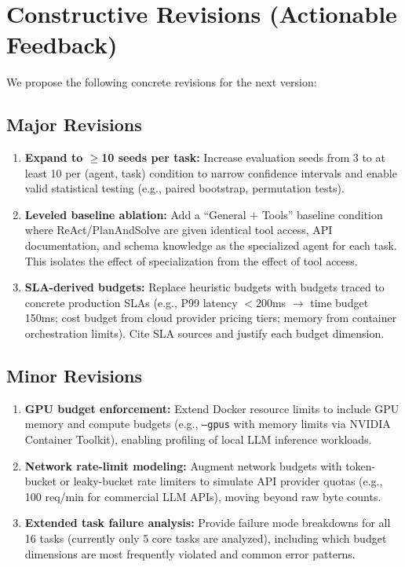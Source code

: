 \documentclass[letterpaper, 10 pt, conference]{ieeeconf}
\begin{document}
\section{Constructive Revisions (Actionable Feedback)}
\label{sec:revisions}

We propose the following concrete revisions for the next version:

\subsection*{Major Revisions}
\begin{enumerate}
    \item \textbf{Expand to $\ge$10 seeds per task:} Increase evaluation seeds from 3 to at least 10 per (agent, task) condition to narrow confidence intervals and enable valid statistical testing (e.g., paired bootstrap, permutation tests).
    
    \item \textbf{Leveled baseline ablation:} Add a ``General + Tools'' baseline condition where ReAct/PlanAndSolve are given identical tool access, API documentation, and schema knowledge as the specialized agent for each task. This isolates the effect of specialization from the effect of tool access.
    
    \item \textbf{SLA-derived budgets:} Replace heuristic budgets with budgets traced to concrete production SLAs (e.g., P99 latency $<200$ms $\to$ time budget 150ms; cost budget from cloud provider pricing tiers; memory from container orchestration limits). Cite SLA sources and justify each budget dimension.
\end{enumerate}

\subsection*{Minor Revisions}
\begin{enumerate}[resume]
    \item \textbf{GPU budget enforcement:} Extend Docker resource limits to include GPU memory and compute budgets (e.g., \texttt{--gpus} with memory limits via NVIDIA Container Toolkit), enabling profiling of local LLM inference workloads.
    
    \item \textbf{Network rate-limit modeling:} Augment network budgets with token-bucket or leaky-bucket rate limiters to simulate API provider quotas (e.g., 100 req/min for commercial LLM APIs), moving beyond raw byte counts.
    
    \item \textbf{Extended task failure analysis:} Provide failure mode breakdowns for all 16 tasks (currently only 5 core tasks are analyzed), including which budget dimensions are most frequently violated and common error patterns.
\end{enumerate}
\end{document}
